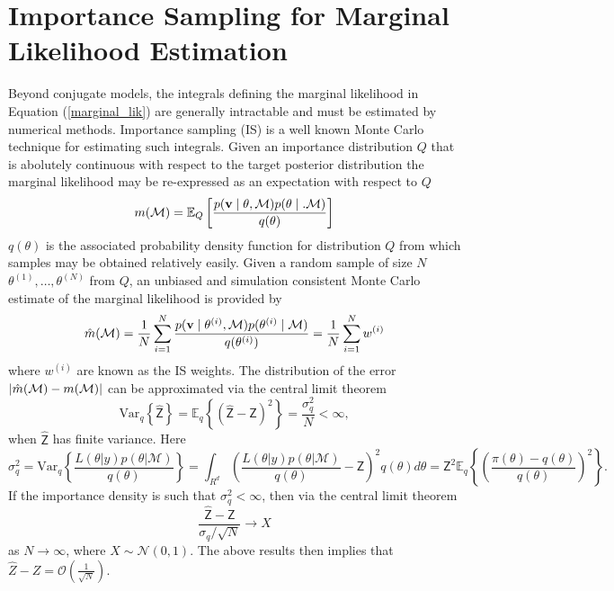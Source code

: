 \documentclass[aoas]{imsart}
\def\Z{\textsf{Z}}
\def\M{{\cal{M}}}
\def\v{\mathbf{v}}
\begin{document}
\section{Importance Sampling for Marginal Likelihood Estimation}
\label{sec:IS}
Beyond conjugate models, the integrals defining the marginal
likelihood in Equation (\ref{marginal_lik}) are generally intractable
and must be estimated by numerical methods.  Importance sampling (IS)
\citep{Gewe:1989} is a well known Monte Carlo technique for estimating
such integrals.  Given an importance distribution $Q$ that is
abolutely continuous with respect to the target posterior distribution
the marginal likelihood may be re-expressed as an expectation with
respect to $Q$
\begin{equation}\label{IS_for_marginal_lik}
m(\M ) = \mathbb{E}_Q\left[ \frac{p(\v \mid \theta, \M)p(\theta \mid.
    \M)} {q(\theta)}\right]
\end{equation}
$q(\theta)$ is the associated probability density function for
distribution $Q$ from which samples may be obtained
relatively easily.
Given a random sample of size $N$   $\theta^{(1)},
\ldots, \theta^{(N)}$ from $Q$,
an  unbiased and simulation consistent Monte Carlo
estimate of the marginal likelihood is provided by
\begin{equation}\label{IS_solution_marlik}
\hat{m}(\M)=\frac{1}{N} \sum_{i=1}^N\frac{p(\v \mid \theta^{(i)},
  \M) p(\theta^{(i)}\mid \M)} {q(\theta^{(i)})} = \frac{1}{N}\sum_{i=1}^N
w^{(i)}
\end{equation}
where $w^{(i)}$ are known as the IS weights. 
The distribution of the error
$|\hat{m}(\M)-m(\M)|$ can be approximated via the central limit theorem
\begin{equation}
\mbox{Var}_q\left\{\hat{\Z}\right\}=\mathbb{E}_q\left\{\left(\hat{\Z}-\Z\right)^2\right\}=\frac{\sigma_q^2}{N}<\infty,
\end{equation}
when $\hat{\Z}$ has finite variance. Here
\begin{equation}
\sigma_q^2=\mbox{Var}_q\left\{\frac{L(\theta|y)p(\theta|\mathcal{M})}{q(\theta)}\right\}=\int_{R^d}\left(\frac{L(\theta|y)p(\theta|\mathcal{M})}{q(\theta)}-\Z\right)^2
q(\theta)d\theta=\Z^2\mathbb{E}_q\left\{\left(\frac{\pi(\theta)-q(\theta)}{q(\theta)}\right)^2\right\}.
\end{equation}
If the importance density is such that $\sigma_q^2<\infty$, then via
the central limit theorem
\begin{equation}
\frac{\hat{\Z}-\Z}{\sigma_q/\sqrt{N}}\rightarrow X
\end{equation}
as $N\rightarrow\infty$, where $X\sim \mathcal{N}(0,1)$. The above
results then implies that
$\hat{Z}-Z=\mathcal{O}(\frac{1}{\sqrt{N}})$.
\end{document}
